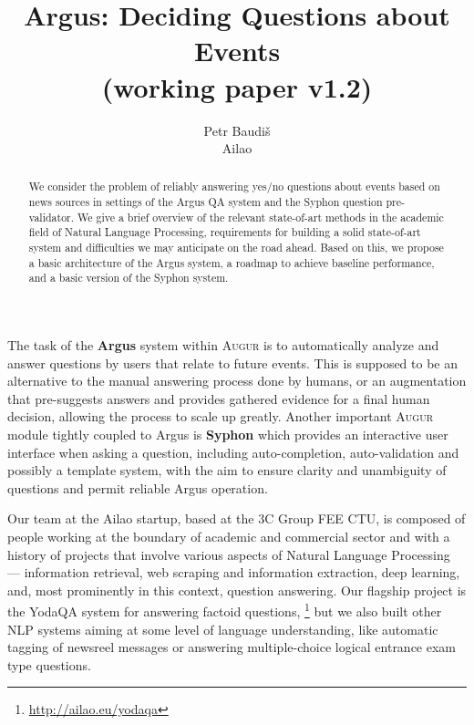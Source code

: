 \documentclass[11pt,a4paper]{article}
\title{Argus: Deciding Questions about Events \\ (working paper v1.2)}
\author{Petr Baudiš \\ Ailao}
\begin{document}
\maketitle

\begin{abstract}%
	We consider the problem of reliably answering yes/no questions
	about events based on news sources in settings of the Argus QA
	system and the Syphon question pre-validator.
	We give a brief overview of the relevant state-of-art methods
	in the academic field of Natural Language Processing,
	requirements for building a solid state-of-art system
	and difficulties we may anticipate on the road ahead.
	Based on this, we propose a basic architecture of the Argus
	system, a roadmap to achieve baseline performance, and a basic
	version of the Syphon system.
\end{abstract}

\vspace{3ex}

The task of the \textbf{Argus} system within \textsc{Augur}
is to automatically analyze and answer
questions by users that relate to future events.  This is supposed
to be an alternative to the manual answering process done by humans,
or an augmentation that pre-suggests answers and provides gathered
evidence for a final human decision, allowing the process to scale
up greatly.  Another important \textsc{Augur} module tightly
coupled to Argus is \textbf{Syphon} which provides an interactive
user interface when asking a question, including auto-completion,
auto-validation and possibly a template system, with the aim to
ensure clarity and unambiguity of questions and permit reliable
Argus operation.

Our team at the Ailao startup, based at the 3C Group FEE CTU,
is composed of people working at the boundary of academic and commercial
sector and with a history of projects that involve
various aspects of Natural Language Processing ---
information retrieval, web scraping and information extraction,
deep learning, and, most prominently in this context, question answering.
Our flagship project is the YodaQA system for answering factoid questions,%
\footnote{\url{http://ailao.eu/yodaqa}}
but we also built other NLP systems aiming at some level of language understanding,
like automatic tagging of newsreel messages
or answering multiple-choice logical entrance exam type questions.
\end{document}
